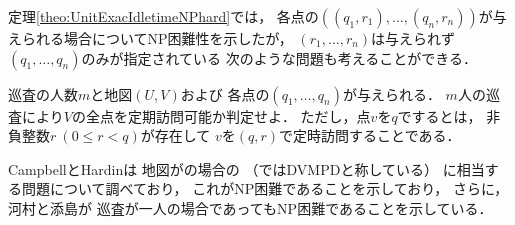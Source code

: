 



定理\ref{theo:UnitExacIdletimeNPhard}では，
各点の{\exactTime}$((q_1, r_1), \ldots, (q_n, r_n))$が与えられる場合についてNP困難性を示したが，
$(r_1, \ldots, r_n)$は与えられず$(q_1, \ldots, q_n)$のみが指定されている
次のような問題も考えることができる．

\begin{intervalSpecifiedPatrollingProblemDecision}
  巡査の人数$m$と地図$(U, V)$および
  各点の{\exactInterval}$(q_1, \ldots, q_n)$が与えられる．
  $m$人の巡査により$V$の全点を定期訪問可能か判定せよ．
  ただし，点$v$を$q$でするとは，
  非負整数$r\ (0 \leq r < q)$が存在して
  $v$を{\exactTime}$(q, r)$で定時訪問することである．
\end{intervalSpecifiedPatrollingProblemDecision}

CampbellとHardinは
地図が{\graphUnit}の場合の
{\intervalSpecifiedPatProbDecision}（\cite{campbell2005vehicle}ではDVMPDと称している）
に相当する問題について調べており，
これがNP困難であることを示しており\cite[Theorem~4]{campbell2005vehicle}，
さらに，河村と添島が
巡査が一人の場合であってもNP困難であることを示している\cite[Theorem~20]{kawamura2015simple}．






